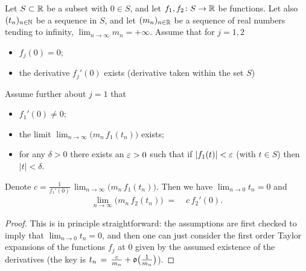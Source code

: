 \begin{lemma}
  \label{lem:modify-limit-taylor}
  \leanok
  Let $S \subset \mathbb{R}$ be a subset with $0 \in S$, and let $f_1, f_2 \colon S \to \mathbb{R}$ be
  functions. Let also $(t_n)_{n \in \mathbb{N}}$ be a sequence in $S$,
  and let $(m_n)_{n \in \mathbb{R}}$ be a sequence of real numbers tending to infinity,
  $\lim_{n \to \infty} m_n = +\infty$.
  Assume that for $j = 1,2$
  \begin{itemize}
    \item $f_j(0)=0$;
    \item the derivative $f_j'(0)$ exists (derivative taken within the set $S$)
  \end{itemize}
  Assume further about $j = 1$ that
  \begin{itemize}
    \item $f_1'(0) \ne 0$;
    \item the limit $\lim_{n \to \infty} \big( m_n \, f_1 (t_n) \big)$ exists;
    \item for any $\delta > 0$ there exists an $\varepsilon > 0$ such that
      if $|f_1(t)| < \varepsilon$ (with $t \in S$) then $|t| < \delta$.
  \end{itemize}
  Denote $c = \frac{1}{f_1'(0)} \, \lim_{n \to \infty} \big( m_n \, f_1 (t_n) \big)$.
  Then we have $\lim_{n \to 0} t_n = 0$ and
  \begin{align*}
    \lim_{n \to \infty} \Big( m_n \, f_2 (t_n) \Big) \; = \; & c \, f_2'(0) .
  \end{align*}
\end{lemma}
\begin{proof}
  \leanok
  This is in principle straightforward:
  the assumptions are first checked to imply that $\lim_{n \to 0} t_n = 0$,
  and then one can just consider the first order Taylor expansions of the
  functions $f_j$ at $0$ given by the assumed existence of the derivatives
  (the key is $t_n \, = \, \frac{c}{m_n} + \mathfrak{o} \big(\frac{1}{m_n}\big)$).
\end{proof}


